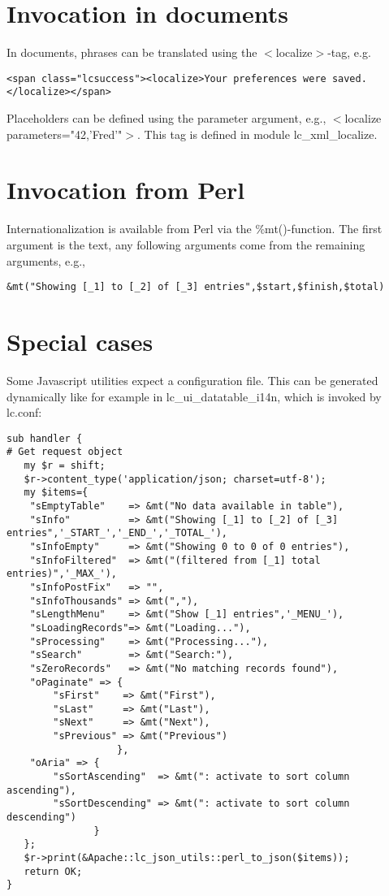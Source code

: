\section{Invocation in documents}
In documents, phrases can be translated using the $<$localize$>$-tag, e.g.
\begin{verbatim}
<span class="lcsuccess"><localize>Your preferences were saved.</localize></span>
\end{verbatim}
Placeholders can be defined using the parameter argument, e.g., $<$localize parameters="42,'Fred'"$>$.
This tag is defined in module lc\_xml\_localize.
\section{Invocation from Perl}
Internationalization is available from Perl via the \%mt()-function. The first argument is the text, any following arguments come from the remaining arguments, e.g., 
\begin{verbatim}
&mt("Showing [_1] to [_2] of [_3] entries",$start,$finish,$total)
\end{verbatim}
\section{Special cases}
Some Javascript utilities expect a configuration file. This can be generated dynamically like for example in lc\_ui\_datatable\_i14n, which is invoked by lc.conf:
\begin{verbatim}
sub handler {
# Get request object
   my $r = shift;
   $r->content_type('application/json; charset=utf-8');
   my $items={
    "sEmptyTable"    => &mt("No data available in table"),
    "sInfo"          => &mt("Showing [_1] to [_2] of [_3] entries",'_START_','_END_','_TOTAL_'),
    "sInfoEmpty"     => &mt("Showing 0 to 0 of 0 entries"),
    "sInfoFiltered"  => &mt("(filtered from [_1] total entries)",'_MAX_'),
    "sInfoPostFix"   => "",
    "sInfoThousands" => &mt(","),
    "sLengthMenu"    => &mt("Show [_1] entries",'_MENU_'),
    "sLoadingRecords"=> &mt("Loading..."),
    "sProcessing"    => &mt("Processing..."),
    "sSearch"        => &mt("Search:"),
    "sZeroRecords"   => &mt("No matching records found"),
    "oPaginate" => {
        "sFirst"    => &mt("First"),
        "sLast"     => &mt("Last"),
        "sNext"     => &mt("Next"),
        "sPrevious" => &mt("Previous")
                   },
    "oAria" => {
        "sSortAscending"  => &mt(": activate to sort column ascending"),
        "sSortDescending" => &mt(": activate to sort column descending")
               }
   };
   $r->print(&Apache::lc_json_utils::perl_to_json($items));
   return OK;
}
\end{verbatim}
